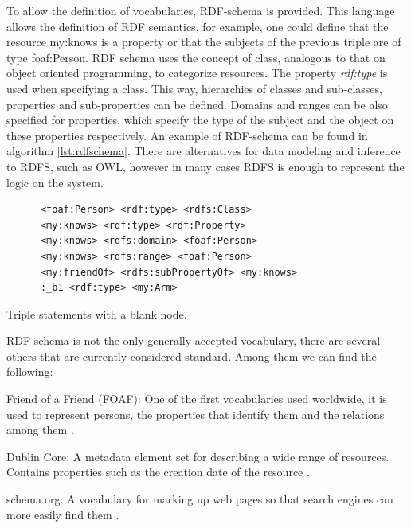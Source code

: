 To allow the definition of vocabularies, RDF-schema\cite{rdfschema} is provided. This language allows the definition of RDF semantics, for example, one could define that the resource my:knows is a property or that the subjects of the previous triple are of type foaf:Person. RDF schema uses the concept of class, analogous to that on object oriented programming, to categorize resources. The property \textit{rdf:type} is used when specifying a class. This way, hierarchies of classes and sub-classes, properties and sub-properties can be defined. Domains and ranges can be also specified for properties, which specify the type of the subject and the object on these properties respectively. An example of RDF-schema can be found in algorithm \ref{lst:rdfschema}. There are alternatives for data modeling and inference to RDFS, such as OWL, however in many cases RDFS is enough to represent the logic on the system.

\begin{listing}\centering
  \begin{minipage}{.6\textwidth}
    \begin{verbatim}
      <foaf:Person> <rdf:type> <rdfs:Class> 
      <my:knows> <rdf:type> <rdf:Property>
      <my:knows> <rdfs:domain> <foaf:Person>
      <my:knows> <rdfs:range> <foaf:Person>
      <my:friendOf> <rdfs:subPropertyOf> <my:knows>
      :_b1 <rdf:type> <my:Arm>
    \end{verbatim}
  \end{minipage}
  \caption{Triple statements with a blank node.}\label{lst:rdfschema}
\end{listing}

RDF schema is not the only generally accepted vocabulary, there are several others that are currently considered standard. Among them we can find the following:

\begin{description}
	\item{Friend of a Friend (FOAF):} One of the first vocabularies used worldwide, it is used to represent persons, the properties that identify them and the relations among them \cite{foafspec}.
	
	\item{Dublin Core:} A metadata element set for describing a wide range of resources. Contains properties such as the creation date of the resource \cite{dublincorespec}.
	
	\item{schema.org: } A vocabulary for marking up web pages so that search engines can more easily find them \cite{schemaspec}.
\end{description}


